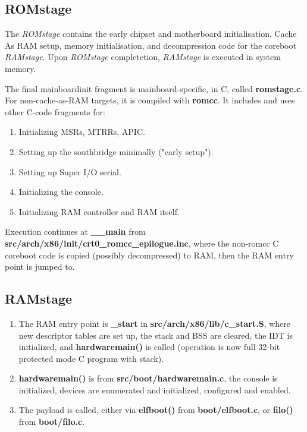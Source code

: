 \subsection{ROMstage}

The \emph{ROMstage} contains the early chipset and motherboard initialisation,
Cache As RAM setup, memory initialisation, and decompression code for the
coreboot \emph{RAMstage}. Upon \emph{ROMstage} completetion, \emph{RAMstage} is
executed in system memory.

The final mainboardinit fragment is mainboard-specific, in C, called
\textbf{romstage.c}. For non-cache-as-RAM targets, it is compiled with
\textbf{romcc}. It includes and uses other C-code fragments for:

\begin{enumerate}
  \item Initializing MSRs, MTRRs, APIC.
  \item Setting up the southbridge minimally ("early setup").
  \item Setting up Super I/O serial.
  \item Initializing the console.
  \item Initializing RAM controller and RAM itself.
\end{enumerate}

Execution continues at \textbf{\_\_main} from
\textbf{src/arch/x86/init/crt0\_romcc\_epilogue.inc}, where the non-romcc C
coreboot code is copied (possibly decompressed) to RAM, then the RAM entry
point is jumped to.

\subsection{RAMstage}

\begin{enumerate}
  \item The RAM entry point is \textbf{\_start} in
  \textbf{src/arch/x86/lib/c\_start.S}, where new descriptor tables are set up,
  the stack and BSS are cleared, the IDT is initialized, and
  \textbf{hardwaremain()} is called (operation is now full 32-bit protected
  mode C program with stack).

  \item \textbf{hardwaremain()} is from \textbf{src/boot/hardwaremain.c}, the
  console is initialized, devices are enumerated and initialized, configured
  and enabled.

  \item The payload is called, either via \textbf{elfboot()} from
  \textbf{boot/elfboot.c}, or \textbf{filo()} from \textbf{boot/filo.c}.
\end{enumerate}

